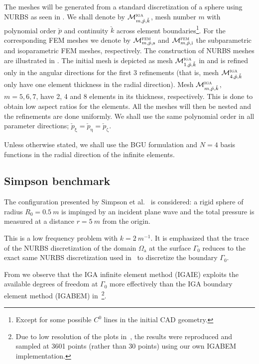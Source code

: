The meshes will be generated from a standard discretization of a sphere using NURBS as seen in . We shall denote by ${\cal M}_{m,\check{p},\check{k}}^{\textsc{iga}}$, mesh number $m$ with polynomial order $\check{p}$ and continuity $\check{k}$ across element boundaries\footnote{Except for some possible $C^0$ lines in the initial CAD geometry.}. For the corresponding FEM meshes we denote by ${\cal M}_{m,\check{p},\mathrm{s}}^{\textsc{fem}}$ and ${\cal M}_{m,\check{p},\mathrm{i}}^{\textsc{fem}}$ the subparametric and isoparametric FEM meshes, respectively. The construction of NURBS meshes are illustrated in . The initial mesh is depicted as mesh ${\cal M}_{1,\check{p},\check{k}}^{\textsc{iga}}$ in  and is refined only in the angular directions for the first 3 refinements (that is, mesh ${\cal M}_{4,\check{p},\check{k}}^{\textsc{iga}}$ only have one element thickness in the radial direction). Mesh ${\cal M}_{m,\check{p},\check{k}}^{\textsc{iga}}$, $m=5,6,7$, have 2, 4 and 8 elements in its thickness, respectively. This is done to obtain low aspect ratios for the elements. All the meshes will then be nested and the refinements are done uniformly. We shall use the same polynomial order in all parameter directions; $\check{p}_\upxi=\check{p}_\upeta=\check{p}_\upzeta$. 

Unless otherwise stated, we shall use the BGU formulation and $N=4$ basis functions in the radial direction of the infinite elements.

\subsection{Simpson benchmark}
The configuration presented by Simpson et al.~\cite{Simpson2014aib} is considered: a rigid sphere of radius $R_0=\SI{0.5}{m}$ is impinged by an incident plane wave and the total pressure is measured at a distance $r=\SI{5}{m}$ from the origin. 

This is a low frequency problem with $k=\SI{2}{m^{-1}}$. It is emphasized that the trace of the NURBS discretization of the domain $\Omega_{\mathrm{a}}$ at the surface $\Gamma_0$ reduces to the exact same NURBS discretization used in~\cite{Simpson2014aib} to discretize the boundary $\Gamma_0$. 

From  we observe that the IGA infinite element method (IGAIE) exploits the available degrees of freedom at $\Gamma_0$ more effectively than the IGA boundary element method (IGABEM) in~\cite{Simpson2014aib}\footnote{Due to low resolution of the plots in~\cite[Fig. 17]{Simpson2014aib}, the results were reproduced and sampled at 3601 points (rather than 30 points) using our own IGABEM implementation.}. 

